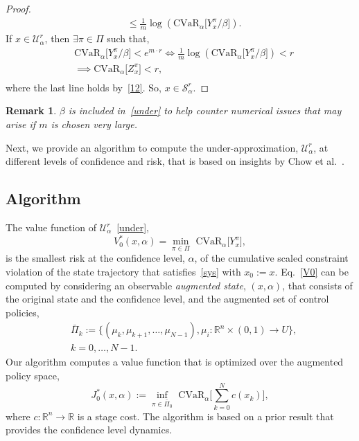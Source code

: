 \documentclass[letterpaper, 10 pt, conference]{ieeeconf}  %
\newtheorem{remark}{Remark}
\begin{document}
\begin{proof}
\begin{equation}
\begin{aligned}
& \leq \frac{1}{m} \log \left(\text{CVaR}_\alpha\big[ Y_x^\pi/\beta \big] \right).
\end{aligned}\label{12}\end{equation}
If $x \in \mathcal{U}_\alpha^r$, then $\exists \pi \in \Pi$ such that,\footnotemark
\begin{equation*}\begin{aligned}
& \text{CVaR}_\alpha \big[ Y_x^\pi /\beta \big] < e^{m\cdot r} \iff \frac{1}{m}\log \left( \text{CVaR}_\alpha \big[  Y_x^\pi /\beta \big] \right) < r \\
& \implies \text{CVaR}_\alpha\big[ Z_x^\pi \big] < r, \\
\end{aligned}\end{equation*}
where the last line holds by~\eqref{12}. So, $x \in \mathcal{S}_\alpha^r$.
\end{proof}
\begin{remark}
$\beta$ is included in~\eqref{under} to help counter numerical issues that may arise if $m$ is chosen very large.
\end{remark}

Next, we provide an algorithm to compute the under-approximation, $\mathcal{U}_\alpha^r$,
at different levels of confidence and risk, that is based on insights by Chow et al.~\cite{chow2015risk}.
\subsection{Algorithm}
The value function of $\mathcal{U}_\alpha^r$~\eqref{under},
\begin{equation}
V_0^*(x,\alpha) = {\underset{\pi \in \Pi}\min} \text{ CVaR}_\alpha \big[ Y_x^\pi \big],
\label{V0}
\end{equation}
is the smallest risk at the confidence level, $\alpha$, of the cumulative scaled constraint violation of the state trajectory that satisfies~\eqref{sys} with $x_0 := x$.
Eq.~\eqref{V0} can be computed by considering 
an observable \textit{augmented state}, $(x,\alpha)$, that consists of the original state and the confidence level,
and the augmented set of control policies,
\begin{equation}\begin{aligned}
& \bar{\Pi}_k := \{ (\mu_k, \mu_{k+1}, \dots, \mu_{N-1}), \mu_i: \mathbb{R}^n \times (0,1) \rightarrow U \},\\
& k = 0, \dots, N-1.
\end{aligned}\label{augpi}\end{equation}
Our algorithm computes a value function that is optimized over the augmented policy space,
\begin{equation}
J_0^*(x,\alpha) := {\underset{\pi \in \bar{\Pi}_0}\inf} \text{ CVaR}_\alpha \Big[ \textstyle\sum_{k=0}^N c(x_k) \Big],
\label{J0}
\end{equation}
where $c: \mathbb{R}^n \rightarrow \mathbb{R}$ is a stage cost.\footnotemark
{}
The algorithm is based on a prior result that provides the confidence level dynamics.
\end{document}
